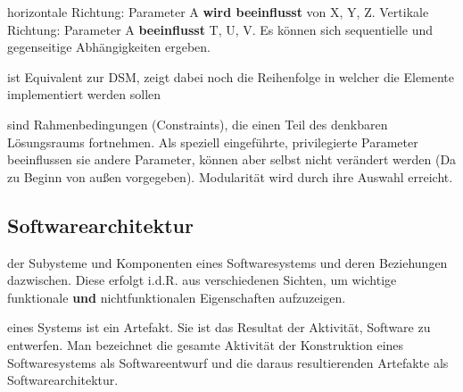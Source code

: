\documentclass[a4paper,fontsize=9pt, DIV=calc]{scrartcl}
\begin{document}
\begin{multicols}{2}
\begin{description}[leftmargin=*]\itemsep-2mm
\item[Design Structure Matrix] horizontale Richtung: Parameter A \textbf{wird beeinflusst} von X, Y, Z. Vertikale Richtung: Parameter A \textbf{beeinflusst} T, U, V. Es können sich sequentielle und gegenseitige Abhängigkeiten ergeben.
\item[Task Structure Matrix] ist Equivalent zur DSM, zeigt dabei noch die Reihenfolge in welcher die Elemente implementiert werden sollen
\item[Design Rules] sind Rahmenbedingungen (Constraints), die einen Teil des denkbaren Lösungsraums fortnehmen. Als speziell eingeführte, privilegierte Parameter beeinflussen sie andere Parameter, können aber selbst nicht verändert werden (Da zu Beginn von außen vorgegeben). Modularität wird durch ihre Auswahl erreicht.
\end{description}

\begin{multicols}{2}
\subsection{Softwarearchitektur}
\begin{description}[leftmargin=*]\itemsep-2mm
\item[Beschreibung] der Subysteme und Komponenten eines Softwaresystems und deren Beziehungen dazwischen. Diese erfolgt i.d.R. aus verschiedenen Sichten, um wichtige funktionale \textbf{und} nichtfunktionalen Eigenschaften aufzuzeigen.
\item[Die Softwarearchitektur] eines Systems ist ein Artefakt. Sie ist das Resultat der Aktivität, Software zu entwerfen. Man bezeichnet die gesamte Aktivität der Konstruktion eines Softwaresystems als Softwareentwurf und die daraus resultierenden Artefakte als Softwarearchitektur.
\end{description}
\end{multicols}

\begin{multicols}{2}

\end{multicols}
\end{multicols}
\end{document}
